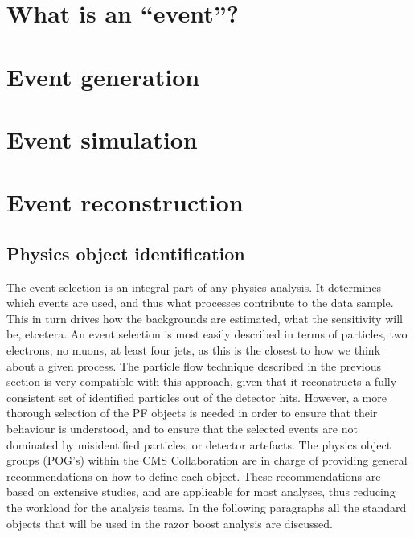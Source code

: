 \section{What is an ``event''? \label{sec:event}}




\section{Event generation \label{sec:event_generation}}




\section{Event simulation \label{sec:event_simulation}}




\section{Event reconstruction \label{sec:event_reconstruction}}




\subsection{Physics object identification \label{sec:event_objects}}

The event selection is an integral part of any physics analysis. It determines which events are
used, and thus what processes contribute to the data sample. This in turn drives how the
backgrounds are estimated, what the sensitivity will be, etcetera. 
An event selection is most easily described in terms of particles, \eg two electrons, no muons, at
least four jets, as this is the closest to how we think about a given process.  
The particle flow technique described in the previous section is very compatible with this approach,
given that it reconstructs a fully consistent set of identified particles out of the detector hits. 
However, a more thorough selection of the PF objects is needed in order to ensure that their
behaviour is understood, and to ensure that the selected events are not dominated by
misidentified particles, or detector artefacts. 
The physics object groups (POG's) within the CMS Collaboration are in charge of providing general
recommendations on how to define each object. These recommendations are based on extensive studies,
and are applicable for most analyses, thus reducing the workload for the analysis teams.
In the following paragraphs all the standard objects that will be used in the razor boost analysis
are discussed.


